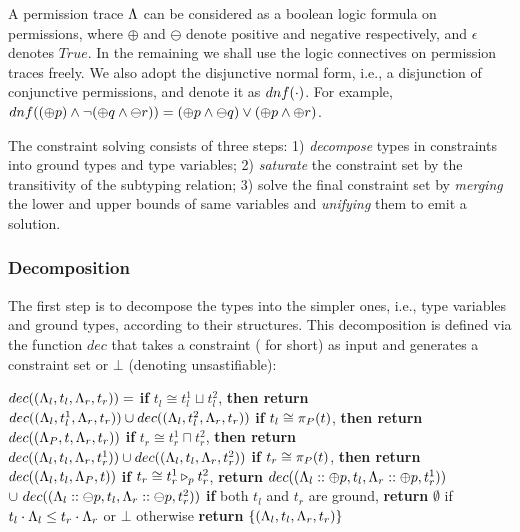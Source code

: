 {{{A permission trace $\trace$ can be considered as a boolean logic formula on permissions, where $\oplus$ and $\ominus$ denote positive and negative respectively, and $\epsilon$ denotes $True$.
In the remaining we shall use the logic connectives on permission traces freely.
We also adopt the disjunctive normal form, i.e., a disjunction of conjunctive permissions, and denote it as $\dnf{\cdot}$. For example, $\dnf{(\oplus p) \land \neg (\oplus q \land \ominus r)}  = (\oplus p \land \ominus q) \lor (\oplus p \land \oplus r) $.

The constraint solving consists of three steps: 1) \emph{decompose} types in constraints into ground types and type variables; 2) \emph{saturate} the constraint set by the transitivity of the subtyping relation; 3) solve the final constraint set by \emph{merging} the lower and upper bounds of same variables and \emph{unifying} them to emit a solution.


\subsubsection{\textbf{Decomposition}}
The first step \iffalse to solve the guarded constraints \fi is to decompose the types into the simpler ones, i.e., type variables and ground types, according to their structures.
This decomposition is defined via the function $dec$ that takes a constraint ( for short) as input and generates a constraint set or $\bot$ (denoting unsastifiable):

\begin{algorithmic}
\STATE $dec(\cCondst{\trace_l}{t_l}{\trace_r}{t_r})=$
\STATE \quad \textbf{if} $t_l \cong t_l^1 \sqcup t_l^2$,  \textbf{then return} $dec(\cCondst{\trace_l}{t_l^1}{\trace_r}{t_r}) \cup dec(\cCondst{\trace_l}{t_l^2}{\trace_r}{t_r})$
\STATE \quad \textbf{if} $t_l \cong \app{t}{P}$, \textbf{then return} $dec(\cCondst{\trace_{P}}{t}{\trace_r}{t_r})$
\STATE \quad \textbf{if} $t_r \cong t_r^1 \sqcap t_r^2$,  \textbf{then return} $dec(\cCondst{\trace_l}{t_l}{\trace_r}{t_r^1}) \cup dec(\cCondst{\trace_l}{t_l}{\trace_r}{t_r^2})$
\STATE \quad \textbf{if} $t_r \cong \app{t}{P}$, \textbf{then return} $dec(\cCondst{\trace_l}{t_l}{\trace_{P}}{t})$
\STATE \quad \textbf{if} $t_r \cong \omerge{p}{t_r^1}{t_r^2}$, \textbf{return} $dec(\cCondst{\trace_l::\oplus p}{t_l}{\trace_r::\oplus p}{t_r^1})$
\STATE $\cup ~dec(\cCondst{\trace_l::\ominus p}{t_l}{\trace_r::\ominus p}{t_r^2})$
\STATE \quad \textbf{if} both $t_l$ and $t_r$ are ground, \textbf{return} $\emptyset$ if $t_l\cdot\trace_l \leq t_r\cdot\trace_r$ or $\bot$ otherwise
\STATE  \quad \textbf{return} $\{\cCondst{\trace_l}{t_l}{\trace_r}{t_r}\}$
\end{algorithmic}

}}}
